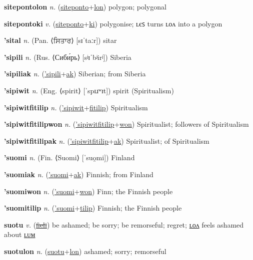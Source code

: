 \textbf{\hypertarget{sitepontolon}{sitepontolon}} \textit{n.} (\hyperlink{siteponto}{siteponto}+\allowbreak \hyperlink{lon}{lon})
polygon; polygonal

\textbf{\hypertarget{sitepontoki}{sitepontoki}} \textit{v.} (\hyperlink{siteponto}{siteponto}+\allowbreak \hyperlink{ki}{ki})
polygonise; ʟєꜱ turns ʟᴏᴧ into a polygon

\textbf{\hypertarget{'sital}{'sital}} \textit{n.} (Pan. ⟨{\gurmukhi{}ਸਿਤਾਰ}⟩ [sɪˈtaːr])
sitar

\textbf{\hypertarget{'sipili}{'sipili}} \textit{n.} (Rus. ⟨Сиби́рь⟩ [sʲɪˈbʲirʲ])
Siberia

\textbf{\hypertarget{'sipiliak}{'sipiliak}} \textit{n.} (\hyperlink{'sipili}{'sipili}+\allowbreak \hyperlink{ak}{ak})
Siberian; from Siberia

\textbf{\hypertarget{'sipiwit}{'sipiwit}} \textit{n.} (Eng. ⟨spirit⟩ [ˈspɪɹʷɪt])
spirit (Spiritualism)

\textbf{\hypertarget{'sipiwitfitilip}{'sipiwitfitilip}} \textit{n.} (\hyperlink{'sipiwit}{'sipiwit}+\allowbreak \hyperlink{fitilip}{fitilip})
Spiritualism

\textbf{\hypertarget{'sipiwitfitilipwon}{'sipiwitfitilipwon}} \textit{n.} (\hyperlink{'sipiwitfitilip}{'sipiwitfitilip}+\allowbreak \hyperlink{won}{won})
Spiritualist; followers of Spiritualism

\textbf{\hypertarget{'sipiwitfitilipak}{'sipiwitfitilipak}} \textit{n.} (\hyperlink{'sipiwitfitilip}{'sipiwitfitilip}+\allowbreak \hyperlink{ak}{ak})
Spiritualist; of Spiritualism

\textbf{\hypertarget{'suomi}{'suomi}} \textit{n.} (Fin. ⟨Suomi⟩ [ˈsuo̯mi])
Finland

\textbf{\hypertarget{'suomiak}{'suomiak}} \textit{n.} (\hyperlink{'suomi}{'suomi}+\allowbreak \hyperlink{ak}{ak})
Finnish; from Finland

\textbf{\hypertarget{'suomiwon}{'suomiwon}} \textit{n.} (\hyperlink{'suomi}{'suomi}+\allowbreak \hyperlink{won}{won})
Finn; the Finnish people

\textbf{\hypertarget{'suomitilip}{'suomitilip}} \textit{n.} (\hyperlink{'suomi}{'suomi}+\allowbreak \hyperlink{tilip}{tilip})
Finnish; the Finnish people

\textbf{\hypertarget{suotu}{suotu}} \textit{v.} (\hyperlink{fieli}{\sout{fieli}})
be ashamed; be sorry; be remorseful; regret; \hyperlink{suotulon}{ʟᴏᴧ} feels ashamed about \hyperlink{suotulum}{ʟᴜᴍ}

\textbf{\hypertarget{suotulon}{suotulon}} \textit{n.} (\hyperlink{suotu}{suotu}+\allowbreak \hyperlink{lon}{lon})
ashamed; sorry; remorseful

